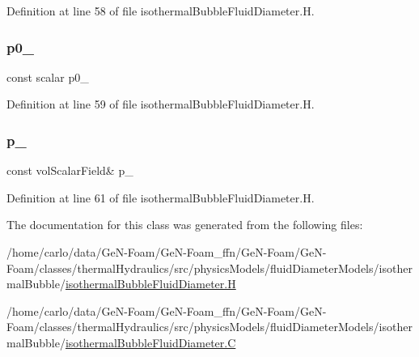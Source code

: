 Definition at line 58 of file isothermal\+Bubble\+Fluid\+Diameter.\+H.

\mbox{\label{classFoam_1_1fluidDiameterModels_1_1isothermal_ab15fca9c1fbb6c6e34a4b5899cb9646e}} 
\subsubsection{\texorpdfstring{p0\+\_\+}{p0\_}}
{\footnotesize\ttfamily const scalar p0\+\_\+\hspace{0.3cm}{\ttfamily [protected]}}



Definition at line 59 of file isothermal\+Bubble\+Fluid\+Diameter.\+H.

\mbox{\label{classFoam_1_1fluidDiameterModels_1_1isothermal_a4c9ce31e482786bbeeed352570fd8d09}} 
\subsubsection{\texorpdfstring{p\+\_\+}{p\_}}
{\footnotesize\ttfamily const vol\+Scalar\+Field\& p\+\_\+\hspace{0.3cm}{\ttfamily [protected]}}



Definition at line 61 of file isothermal\+Bubble\+Fluid\+Diameter.\+H.



The documentation for this class was generated from the following files\+:\begin{DoxyCompactItemize}
\item 
/home/carlo/data/\+Ge\+N-\/\+Foam/\+Ge\+N-\/\+Foam\+\_\+ffn/\+Ge\+N-\/\+Foam/\+Ge\+N-\/\+Foam/classes/thermal\+Hydraulics/src/physics\+Models/fluid\+Diameter\+Models/isothermal\+Bubble/\hyperlink{isothermalBubbleFluidDiameter_8H}{isothermal\+Bubble\+Fluid\+Diameter.\+H}\item 
/home/carlo/data/\+Ge\+N-\/\+Foam/\+Ge\+N-\/\+Foam\+\_\+ffn/\+Ge\+N-\/\+Foam/\+Ge\+N-\/\+Foam/classes/thermal\+Hydraulics/src/physics\+Models/fluid\+Diameter\+Models/isothermal\+Bubble/\hyperlink{isothermalBubbleFluidDiameter_8C}{isothermal\+Bubble\+Fluid\+Diameter.\+C}\end{DoxyCompactItemize}
